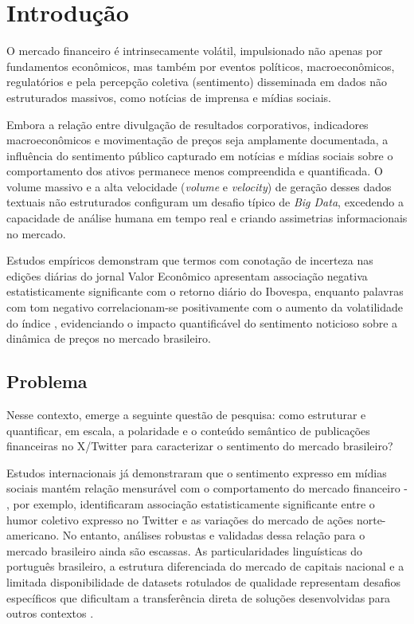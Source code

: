 \chapter{Introdução} \label{Cap:Introdução}

O mercado financeiro é intrinsecamente volátil, impulsionado não apenas por fundamentos econômicos, mas também por eventos políticos, macroeconômicos, regulatórios e pela percepção coletiva (sentimento) disseminada em dados não estruturados massivos, como notícias de imprensa e mídias sociais.

Embora a relação entre divulgação de resultados corporativos, indicadores macroeconômicos e movimentação de preços seja amplamente documentada, a influência do sentimento público capturado em notícias e mídias sociais sobre o comportamento dos ativos permanece menos compreendida e quantificada. O volume massivo e a alta velocidade (\textit{volume} e \textit{velocity}) de geração desses dados textuais não estruturados configuram um desafio típico de \textit{Big Data}, excedendo a capacidade de análise humana em tempo real e criando assimetrias informacionais no mercado.

Estudos empíricos demonstram que termos com conotação de incerteza nas edições diárias do jornal Valor Econômico apresentam associação negativa estatisticamente significante com o retorno diário do Ibovespa, enquanto palavras com tom negativo correlacionam-se positivamente com o aumento da volatilidade do índice \cite{galdi2018}, evidenciando o impacto quantificável do sentimento noticioso sobre a dinâmica de preços no mercado brasileiro.


\section{Problema}

Nesse contexto, emerge a seguinte questão de pesquisa: como estruturar e quantificar, em escala, a polaridade e o conteúdo semântico de publicações financeiras no X/Twitter para caracterizar o sentimento do mercado brasileiro?

Estudos internacionais já demonstraram que o sentimento expresso em mídias sociais mantém relação mensurável com o comportamento do mercado financeiro - , por exemplo, identificaram associação estatisticamente significante entre o humor coletivo expresso no Twitter e as variações do mercado de ações norte-americano. No entanto, análises robustas e validadas dessa relação para o mercado brasileiro ainda são escassas. As particularidades linguísticas do português brasileiro, a estrutura diferenciada do mercado de capitais nacional e a limitada disponibilidade de datasets rotulados de qualidade representam desafios específicos que dificultam a transferência direta de soluções desenvolvidas para outros contextos \cite{santos2023finbert}.

